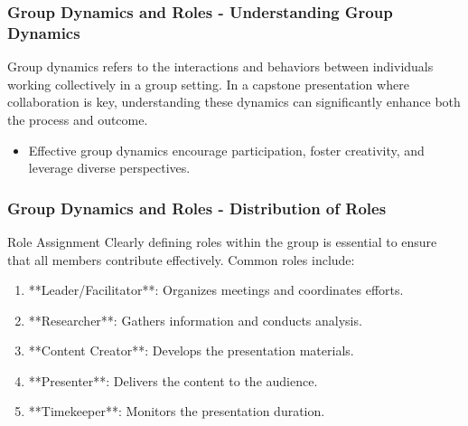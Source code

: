 \documentclass[aspectratio=169]{beamer}
\begin{document}
\begin{frame}[fragile]
    \frametitle{Group Dynamics and Roles - Understanding Group Dynamics}
    
    Group dynamics refers to the interactions and behaviors between individuals working collectively in a group setting. In a capstone presentation where collaboration is key, understanding these dynamics can significantly enhance both the process and outcome.
    
    \begin{itemize}
        \item Effective group dynamics encourage participation, foster creativity, and leverage diverse perspectives.
    \end{itemize}

\end{frame}

\begin{frame}[fragile]
    \frametitle{Group Dynamics and Roles - Distribution of Roles}
    
    \begin{block}{Role Assignment}
        Clearly defining roles within the group is essential to ensure that all members contribute effectively. Common roles include:
    \end{block}
    
    \begin{enumerate}
        \item **Leader/Facilitator**: Organizes meetings and coordinates efforts.
        \item **Researcher**: Gathers information and conducts analysis.
        \item **Content Creator**: Develops the presentation materials.
        \item **Presenter**: Delivers the content to the audience.
        \item **Timekeeper**: Monitors the presentation duration.
    \end{enumerate}

\end{frame}
\end{document}
